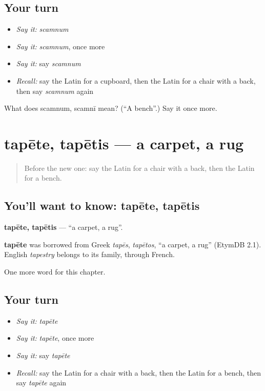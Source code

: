 \subsection*{Your turn}
\begin{itemize}
\raggedright
  \item \emph{Say it:} \emph{scamnum}
  \item \emph{Say it:} \emph{scamnum}, once more
  \item \emph{Say it:} say \emph{scamnum}
  \item \emph{Recall:} say the Latin for a cupboard, then the Latin for a chair with a back, then say \emph{scamnum} again
\end{itemize}

\begin{tcolorbox}[breakable,colback=teal!4,colframe=teal!35!black,title={Before you move on}]
What does scamnum, scamnī mean? (\textquotedblleft{}A bench\textquotedblright{}.) Say it once more.
\end{tcolorbox}
\section[tapēte, tapētis]{tapēte, tapētis — a carpet, a rug}

\label{lesson:LA-C139-tapete}



\begin{quote}
Before the new one: say the Latin for a chair with a back, then the Latin for a bench.
\end{quote}

\subsection*{You'll want to know: tapēte, tapētis}
\textbf{tapēte, tapētis} — \textquotedblleft{}a carpet, a rug\textquotedblright{}.

\begin{cousinweb}
\textbf{tapēte} was borrowed from Greek \emph{tapēs}, \emph{tapētos}, \textquotedblleft{}a carpet, a rug\textquotedblright{} (EtymDB 2.1). English \emph{tapestry} belongs to its family, through French.
\end{cousinweb}

\begin{grammarlens}[title={What you've built}]
One more word for this chapter.
\end{grammarlens}

\subsection*{Your turn}
\begin{itemize}
\raggedright
  \item \emph{Say it:} \emph{tapēte}
  \item \emph{Say it:} \emph{tapēte}, once more
  \item \emph{Say it:} say \emph{tapēte}
  \item \emph{Recall:} say the Latin for a chair with a back, then the Latin for a bench, then say \emph{tapēte} again
\end{itemize}

